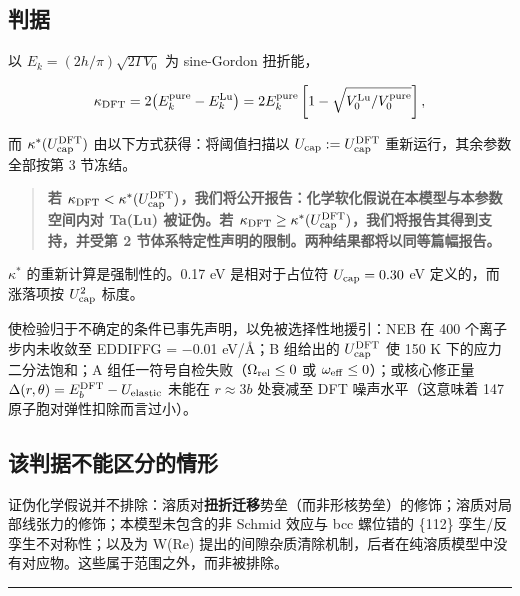 \hypertarget{ux5224ux636e}{%
\subsection{判据}\label{sec:ux5224ux636e}}

以 \(E_k = (2h/\pi)\sqrt{2\Gamma V_0}\) 为 sine-Gordon 扭折能，

\[\kappa_{\rm DFT} = 2\bigl(E_k^{\rm pure} - E_k^{\rm Lu}\bigr) = 2E_k^{\rm pure}\left[1 - \sqrt{V_0^{\rm Lu}/V_0^{\rm pure}}\right],\]

而 \(\kappa^*(U_{\rm cap}^{\rm DFT})\) 由以下方式获得：将阈值扫描以 \(U_{\rm cap} := U_{\rm cap}^{\rm DFT}\) 重新运行，其余参数全部按第 3 节冻结。

\begin{quote}
\textbf{若 \(\kappa_{\rm DFT} < \kappa^*(U_{\rm cap}^{\rm DFT})\)，我们将公开报告：化学软化假说在本模型与本参数空间内对 Ta(Lu) 被证伪。若 \(\kappa_{\rm DFT} \geq \kappa^*(U_{\rm cap}^{\rm DFT})\)，我们将报告其得到支持，并受第 2 节体系特定性声明的限制。两种结果都将以同等篇幅报告。}
\end{quote}

\(\kappa^*\) 的重新计算是强制性的。0.17 eV 是相对于占位符 \(U_{\rm cap} = 0.30\) eV 定义的，而涨落项按 \(U_{\rm cap}^2\) 标度。

使检验归于不确定的条件已事先声明，以免被选择性地援引：NEB 在 400 个离子步内未收敛至 EDDIFFG = −0.01 eV/Å；B 组给出的 \(U_{\rm cap}^{\rm DFT}\) 使 150 K 下的应力二分法饱和；A 组任一符号自检失败（\(\Omega_{\rm rel} \leq 0\) 或 \(\omega_{\rm eff} \leq 0\)）；或核心修正量 \(\Delta(r,\theta) = E_b^{\rm DFT} - U_{\rm elastic}\) 未能在 \(r\approx3b\) 处衰减至 DFT 噪声水平（这意味着 147 原子胞对弹性扣除而言过小）。

\hypertarget{ux8be5ux5224ux636eux4e0dux80fdux533aux5206ux7684ux60c5ux5f62}{%
\subsection{该判据不能区分的情形}\label{sec:ux8be5ux5224ux636eux4e0dux80fdux533aux5206ux7684ux60c5ux5f62}}

证伪化学假说并不排除：溶质对\textbf{扭折迁移}势垒（而非形核势垒）的修饰；溶质对局部线张力的修饰；本模型未包含的非 Schmid 效应与 bcc 螺位错的 \{112\} 孪生/反孪生不对称性；以及为 W(Re) 提出的间隙杂质清除机制，后者在纯溶质模型中没有对应物。这些属于范围之外，而非被排除。

\begin{center}\rule{0.5\linewidth}{0.5pt}\end{center}

